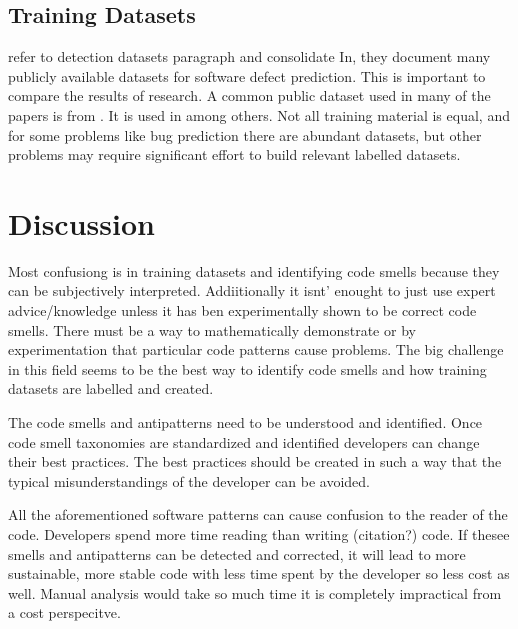 \documentclass[conference]{IEEEtran}
\begin{document}
\subsection{Training Datasets}
refer to detection datasets paragraph and consolidate
In\cite{li_progress_2018}, they document many publicly available datasets for software defect prediction. This is important to compare the results of research.
A common public dataset used in many of the papers is from \cite{fontana_code_2017}. It is used in \cite{karaduzovic-hadziabdic_comparison_2018} among others.
Not all training material is equal\cite{fakhoury_keep_2018}, and for some problems like bug prediction there are abundant datasets, but other problems may require significant effort to build relevant labelled datasets.

\section{Discussion}
Most confusiong is in training datasets and identifying code smells because they can be subjectively interpreted.
Addiitionally it isnt' enought to just use expert advice/knowledge unless it has ben experimentally shown to be correct code smells. 
There must be a way to mathematically demonstrate or by experimentation that particular code patterns cause problems.
The big challenge in this field seems to be the best way to identify code smells and how training datasets are labelled and created.

The code smells and antipatterns need to be understood and identified.
Once code smell taxonomies are standardized and identified developers can change their best practices.
The best practices should be created in such a way that the typical misunderstandings of the developer can be avoided.

All the aforementioned software patterns can cause confusion to the reader of the code. Developers spend more time reading than writing (citation?) code. If thesee smells and antipatterns can be detected and corrected, it will lead to more sustainable, more stable code with less time spent by the developer so less cost as well.
Manual analysis would take so much time it is completely impractical from a cost perspecitve.
\end{document}
